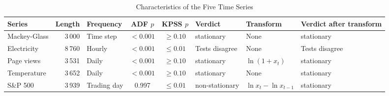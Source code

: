 \begin{table}[t]
\centering
\caption{Characteristics of the Five Time Series}
\label{tab:datasets}
\begin{tabular}{@{}lrlcclll@{}}
\toprule
Series & Length & Frequency & ADF $p$ & KPSS $p$ & Verdict & Transform & Verdict after transform \\
\midrule
Mackey-Glass & 3\,000 & Time step & $<0.001$ & $\geq 0.10$ & stationary & None & stationary \\
Electricity & 8\,760 & Hourly & $<0.001$ & $\leq 0.01$ & Tests disagree & None & Tests disagree \\
Page views & 3\,531 & Daily & $<0.001$ & $\geq 0.10$ & stationary & $\ln(1+x_t)$ & stationary \\
Temperature & 3\,652 & Daily & $<0.001$ & $\geq 0.10$ & stationary & None & stationary \\
S\&P 500 & 3\,939 & Trading day & 0.997 & $\leq 0.01$ & non-stationary & $\ln x_t - \ln x_{t-1}$ & stationary \\
\bottomrule
\end{tabular}
\end{table}
